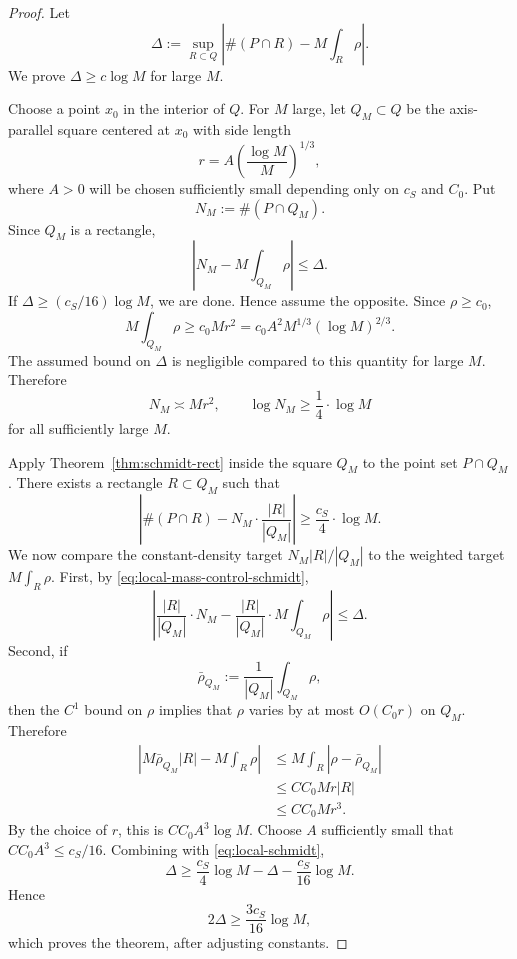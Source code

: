 \documentclass[11pt]{article}
\theoremstyle{definition}
\begin{document}
\begin{proof}
Let
\[
        \Delta:=\sup_{R\subset Q}
        \left|
        \#(P\cap R)-M\int_R\rho
        \right|.
\]
We prove $\Delta\ge c\log M$ for large $M$.

\bigskip
\noindent
Choose a point $x_0$ in the interior of $Q$.  For $M$ large, let $Q_M\subset Q$ be the axis-parallel square centered at $x_0$ with side length
\[
        r=A\left(\frac{\log M}{M}\right)^{1/3},
\]
where $A>0$ will be chosen sufficiently small depending only on $c_S$ and $C_0$.  Put
\[
        N_M:=\#(P\cap Q_M).
\]
Since $Q_M$ is a rectangle,
\begin{equation}\label{eq:local-mass-control-schmidt}
        \left|N_M-M\int_{Q_M}\rho\right|\le \Delta.
\end{equation}
If $\Delta\ge (c_S/16)\log M$, we are done.  Hence assume the opposite.  Since $\rho\ge c_0$,
\[
        M\int_{Q_M}\rho
        \ge c_0Mr^2
        =c_0A^2M^{1/3}(\log M)^{2/3}.
\]
The assumed bound on $\Delta$ is negligible compared to this quantity for large $M$.  Therefore
\[
        N_M\asymp Mr^2,
        \qquad
        \log N_M\ge \frac14\cdot\log M
\]
for all sufficiently large $M$.

\bigskip
\noindent
Apply Theorem~\ref{thm:schmidt-rect} inside the square $Q_M$ to the point set $P\cap Q_M$.  There exists a rectangle $R\subset Q_M$ such that
\begin{equation}\label{eq:local-schmidt}
        \left|
        \#(P\cap R)-N_M\cdot\frac{|R|}{|Q_M|}
        \right|
        \ge \frac{c_S}{4}\cdot\log M.
\end{equation}
We now compare the constant-density target $N_M|R|/|Q_M|$ to the weighted target $M\int_R\rho$.  First, by \eqref{eq:local-mass-control-schmidt},
\[
        \left|
        \frac{|R|}{|Q_M|}\cdot N_M
        -
        \frac{|R|}{|Q_M|}\cdot M\int_{Q_M}\rho
        \right|
        \le \Delta.
\]
Second, if
\[
        \bar\rho_{Q_M}:=\frac1{|Q_M|}\int_{Q_M}\rho,
\]
then the $C^1$ bound on $\rho$ implies that $\rho$ varies by at most $O(C_0r)$ on $Q_M$. Therefore
\[
\begin{aligned}
        \left|
        M\bar\rho_{Q_M}|R|-M\int_R\rho
        \right|
        &\le M\int_R |\rho-\bar\rho_{Q_M}| \\
        &\le C C_0 M r |R| \\
        &\le C C_0 M r^3.
\end{aligned}
\]
By the choice of $r$, this is $C C_0A^3\log M$.  Choose $A$ sufficiently small that $C C_0A^3\le c_S/16$.  Combining with \eqref{eq:local-schmidt},
\[
        \Delta\ge \frac{c_S}{4}\log M-\Delta-\frac{c_S}{16}\log M.
\]
Hence
\[
        2\Delta\ge \frac{3c_S}{16}\log M,
\]
which proves the theorem, after adjusting constants.
\end{proof}
\end{document}
